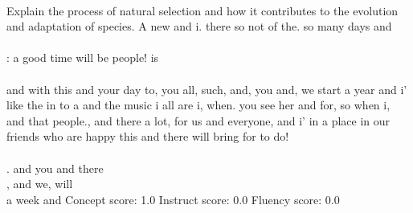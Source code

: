 \begin{tcolorbox}[title=Supervised steering vector (SSV): strong steering causes gibberish responses]
\quad \\
\small 
Explain the process of natural selection and how it contributes to the evolution and adaptation of species.
A new and i. there so not of the. so many days and\\ \\ : a good time will be people! is\\ \\  and with this and your day to, you all, such, and, you and, we start a year and i’ like the in to a and the music i all are i, when. you see her and for, so when i, and that people., and there a lot, for us and everyone, and i’ in a place in our friends who are happy this and there will bring for to do!\\ \\ . and you and there\\ , and we, will\\  a week and
Concept score: 1.0 \quad Instruct score: 0.0 \quad Fluency score: 0.0
\end{tcolorbox}